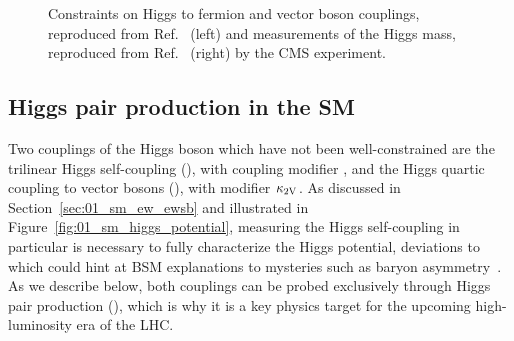\begin{figure}[ht]
	\centering
	\caption{Constraints on Higgs to fermion and vector boson couplings, reproduced from Ref.~\cite{CMS:2022dwd} (left) and measurements of the Higgs mass, reproduced from Ref.~\cite{CMS:2020xrn} (right) by the CMS experiment.}
	\label{fig:01_sm_higgs_constraints}
\end{figure}


\subsection{Higgs pair production in the SM}
\label{sec:05_smhh}

Two couplings of the Higgs boson which have not been well-constrained are the trilinear Higgs self-coupling (\HHH), with coupling modifier \kapl, and the Higgs quartic coupling to vector bosons (\HHVV), with modifier $\kappa_{2\textrm{V}}$.
As discussed in Section~\ref{sec:01_sm_ew_ewsb} and illustrated in Figure~\ref{fig:01_sm_higgs_potential}, measuring the Higgs self-coupling in particular is necessary to fully characterize the Higgs potential, deviations to which could hint at BSM explanations to mysteries such as baryon asymmetry~\cite{Reichert:2017puo}.
As we describe below, both couplings can be probed exclusively through Higgs pair production (\HH), which is why it is a key physics target for the upcoming high-luminosity era of the LHC.

